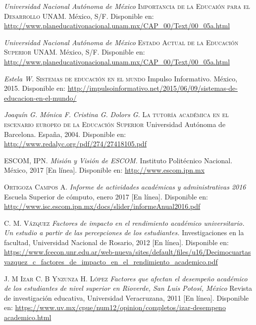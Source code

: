 
\begin{thebibliography}{X}

		\textit{Universidad Nacional Autónoma de México}
		\textsc{Importancia de la Educaión para el Desarrollo} UNAM. México, S/F. 
		Disponible en: \url{http://www.planeducativonacional.unam.mx/CAP_00/Text/00_05a.html}

		\textit{Universidad Nacional Autónoma de México}
		\textsc{Estado Actual de la Educación Superior} UNAM. México, S/F. 
		Disponible en: \url{http://www.planeducativonacional.unam.mx/CAP_00/Text/00_05a.html}

		\textit{Estela W.}
		\textsc{Sistemas de educación en el mundo} Impulso Informativo. México, 2015. 
		Disponible en: \url{http://impulsoinformativo.net/2015/06/09/sistemas-de-educacion-en-el-mundo/}

		\textit{Joaquín G.}
		\textit{Mónica F.}
		\textit{Cristina G.}
		\textit{Dolors G.}
		\textsc{La tutoría académica en el escenario europeo de la Educación Superior} Universidad Autónoma de Barcelona. España, 2004. 
		Disponible en: \url{http://www.redalyc.org/pdf/274/27418105.pdf}

		\textsc{ESCOM, IPN.}
		\textit{Misión y Visión de ESCOM.} 
		Instituto Politécnico Nacional. México, 2017 [En línea]. Disponible en:
		\url{http://www.escom.ipn.mx}

		\textsc{Ortigoza Campos A.}
		\textit{Informe de actividades académicas y administrativas 2016} Escuela Superior 
		de cómputo, enero 2017 [En línea]. Disponible en:
		\url{http://www.isc.escom.ipn.mx/docs/slider/informeAnual2016.pdf}

		\textsc{C. M. Vázquez}
		\textit{Factores de impacto en el rendimiento académico universitario. Un estudio a
		partir de las percepciones de los estudiantes.} Investigaciones en la facultad, 
		Universidad Nacional de Rosario, 2012 [En línea]. Disponible en:
		\url{https://www.fcecon.unr.edu.ar/web-nueva/sites/default/files/u16/Decimocuartas
		vazquez_c_factores_de_impacto_en_el_rendimiento_academico.pdf}

		\textsc{J. M Izar}
		\textsc{C. B Ynzunza}
		\textsc{H. López}
		\textit{Factores que afectan el desempeño académico de los estudiantes
		de nivel superior en Rioverde, San Luis Potosí, México} Revista de investigación educativa,
		Universidad Veracruzana, 2011 [En línea]. Disponible en:
		\url{https://www.uv.mx/cpue/num12/opinion/completos/izar-desempeno academico.html}
		

\end{thebibliography}
